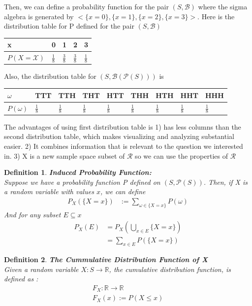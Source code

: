 \documentclass[11pt,oneside]{book}
\theoremstyle{break}
\theoremstyle{break}
\newtheorem{defn}{Definition}[corL]
\begin{document}
Then, we can define a probability function for the pair $(S,\mathcal{B})$ where the sigma algebra is generated by $<\{x=0\},\{x=1\},\{x=2\},\{x=3\}>$. Here is the distribution table for P defined for the pair $(S,\mathcal{B})$ \begin{center}
\begin{tabular}{|l|l|l|l|l|}
\hline
x        & 0             & 1             & 2             & 3             \\ \hline
$P(X=\mathcal{X})$ & $\frac{1}{8}$ & $\frac{3}{8}$ & $\frac{3}{8}$ & $\frac{1}{8}$ \\ \hline
\end{tabular}
\end{center}
Also, the distribution table for $(S,\mathcal{B}(\mathcal{P}(S)))$ is  \begin{center}
\begin{tabular}{|l|l|l|l|l|l|l|l|l|}
\hline
 $\omega$& TTT & TTH & THT & HTT & THH & HTH & HHT & HHH \\ \hline
 $P(\omega)$&  $\frac{1}{8}$   &   $\frac{1}{8}$   &    $\frac{1}{8}$  &   $\frac{1}{8}$   &   $\frac{1}{8}$   &   $\frac{1}{8}$   &   $\frac{1}{8}$   &  $\frac{1}{8}$    \\ \hline
\end{tabular}
\end{center}
The advantages of using first distribution table is 1) has less columns than the second distribution table, which makes visualizing and analyzing substantial easier. 2) It combines information that is relevant to the question we interested in. 3) X is a new sample space subset of $\mathcal{R}$ so we can use the properties of $\mathcal{R}$\\
\begin{defn}
\textbf{Induced Probability Function:}\\
Suppose we have a probability function P defined on $(S,\mathcal{P}(S))$. Then, if X is a random variable with values $x$, we can define\begin{align*}
P_X(\{X=x\})&:=\sum_{\omega\in \{X=x\}}P(\omega)
\end{align*}
And for any subset $E\subseteq x$\begin{align*}
P_X(E)&=P_X\left( \bigcup_{x\in E}\{X=x\}\right)\\
&=\sum_{x\in E}P(\{X=x\})
\end{align*}
\end{defn}
\begin{defn}
\textbf{The Cummulative Distribution Function of X}\\
Given a random variable $X:S\rightarrow \mathbb{R}$, the cumulative distribution function, is defined as :\begin{align*}
F_X:\mathbb{R}\rightarrow \mathbb{R}\\
F_X(x):=P(X\leq x)
\end{align*}
\end{defn}
\end{document}
